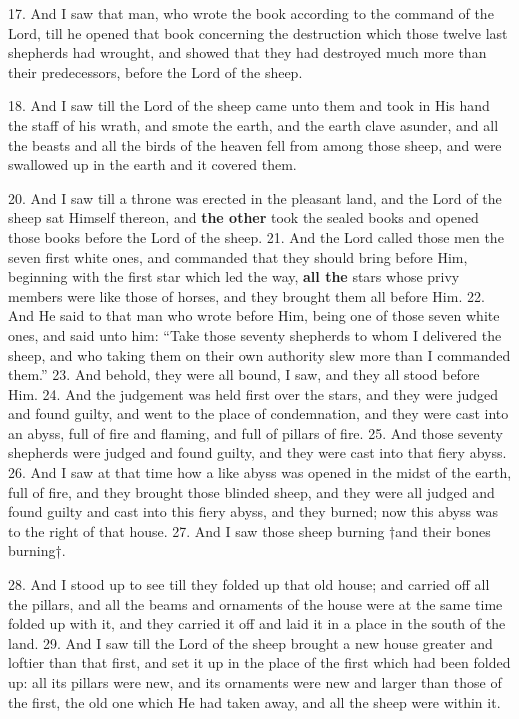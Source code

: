 17. And I saw that
man, who wrote the book
according to the command
of the Lord, till he
opened that book concerning
the destruction
which those twelve last
shepherds had wrought,
and showed that they had
destroyed much more
than their predecessors,
before the Lord of the
sheep.

18. And I saw till the
Lord of the sheep came
unto them and took in
His hand the staff of his
wrath, and smote the
earth, and the earth clave
asunder, and all the
beasts and all the birds
of the heaven fell from
among those sheep, and
were swallowed up in the
earth and it covered them.


20. And I saw till a throne was erected in the
pleasant land, and the Lord of the sheep sat Himself
thereon, and \textbf{the other} took the sealed books and
opened those books before the Lord of the sheep.
21. And the Lord called those men the seven first
white ones, and commanded that they should bring
before Him, beginning with the first star which led
the way, \textbf{all the} stars whose privy members were
like those of horses, and they brought them all before
Him. 22. And He said to that man who wrote before
Him, being one of those seven white ones, and
said unto him: “Take those seventy shepherds to
whom I delivered the sheep, and who taking them on
their own authority slew more than I commanded
them.” 23. And behold, they were all bound, I saw,
and they all stood before Him. 24. And the judgement
was held first over the stars, and they were
judged and found guilty, and went to the place of
condemnation, and they were cast into an abyss, full
of fire and flaming, and full of pillars of fire. 25. And
those seventy shepherds were judged and found
guilty, and they were cast into that fiery abyss.
26. And I saw at that time how a like abyss was
opened in the midst of the earth, full of fire, and they
brought those blinded sheep, and they were all
judged and found guilty and cast into this fiery abyss,
and they burned; now this abyss was to the right
of that house. 27. And I saw those sheep burning
†and their bones burning†.


28. And I stood up to see till they folded up that
old house; and carried off all the pillars, and all the
beams and ornaments of the house were at the same
time folded up with it, and they carried it off and
laid it in a place in the south of the land. 29. And
I saw till the Lord of the sheep brought a new house
greater and loftier than that first, and set it up in the
place of the first which had been folded up: all its
pillars were new, and its ornaments were new and
larger than those of the first, the old one which He
had taken away, and all the sheep were within it.

